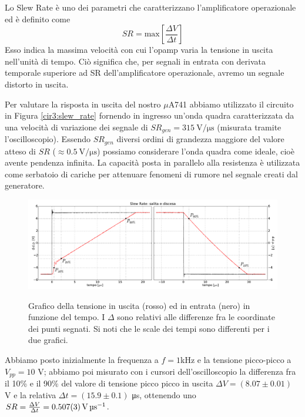 Lo Slew Rate è uno dei parametri che caratterizzano l'amplificatore operazionale ed è definito come
$$SR = \mathrm{max}\left[\frac{\Delta V}{\Delta t}\right]$$
Esso indica la massima velocità con cui l'opamp varia la tensione in uscita nell'unità di tempo.
Ciò significa che, per segnali in entrata con derivata temporale superiore ad SR dell'amplificatore operazionale, avremo un segnale distorto in uscita.

Per valutare la risposta in uscita del nostro $\mu$A741 abbiamo utilizzato il circuito in Figura \ref{cir3:slew_rate} fornendo in ingresso un'onda quadra caratterizzata da una velocità di variazione dei segnale di $SR_{gen}=\SI{315}{\volt\per\micro\second}$ (misurata tramite l'oscilloscopio).
Essendo $SR_{gen}$ diversi ordini di grandezza maggiore del valore atteso di $SR$ ($\approx \SI{0.5}{\volt\per\micro\second} $) possiamo considerare l'onda quadra come ideale, cioè avente pendenza infinita.
La capacità posta in parallelo alla resistenza è utilizzata come serbatoio di cariche per attenuare fenomeni di rumore nel segnale creati dal generatore.

\begin{figure}[ht]
 \centering
   {\includegraphics[width=\textwidth]{../E03/latex/sr_uad.pdf}}
 \caption{Grafico della tensione in uscita (rosso) ed in entrata (nero) in funzione del tempo. I $\Delta$ sono relativi alle differenze fra le coordinate dei punti segnati. Si noti che le scale dei tempi sono differenti per i due grafici.}
 \label{gr3:slew_rate}
\end{figure}

Abbiamo posto inizialmente la frequenza a $f=1$\si{\kilo\hertz} e la tensione picco-picco a $V_{pp}=10$ \si{\volt};
abbiamo poi misurato con i cursori dell'oscilloscopio la differenza fra il 10\% e il 90\% del valore di tensione picco picco in uscita $\Delta V = (8.07 \pm 0.01)$ \si{\volt}  e la relativa $\Delta t = (15.9 \pm 0.1)$ \si{\micro\second}, ottenendo uno $SR= \frac{\Delta V}{\Delta t} = \SI{0.507 \pm 0.003}{\volt\per\micro\second}$.

